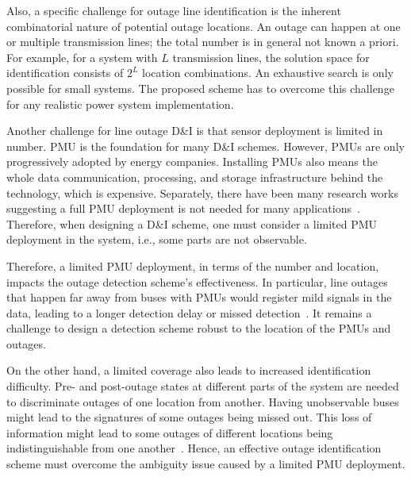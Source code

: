 Also, a specific challenge for outage line identification is the inherent combinatorial nature of potential outage locations. An outage can happen at one or multiple transmission lines; the total number is in general not known a priori. For example, for a system with $L$ transmission lines, the solution space for identification consists of $2^L$ location combinations. An exhaustive search is only possible for small systems. The proposed scheme has to overcome this challenge for any realistic power system implementation.


Another challenge for line outage D\&I is that sensor deployment is limited in number. 
PMU is the foundation for many D\&I schemes. However, PMUs are only progressively adopted by energy companies. Installing PMUs also means the whole data communication, processing, and storage infrastructure behind the technology, which is expensive. Separately, there have been many research works suggesting a full PMU deployment is not needed for many applications~\cite{aminifar2014synchrophasor}. Therefore, when designing a D\&I scheme, one must consider a limited PMU deployment in the system, i.e., some parts are not observable.

Therefore, a limited PMU deployment, in terms of the number and location, impacts the outage detection scheme’s effectiveness. In particular, line outages that happen far away from buses with PMUs would register mild signals in the data, leading to a longer detection delay or missed detection~\cite{yang2020control}. It remains a challenge to design a detection scheme robust to the location of the PMUs and outages. 

On the other hand, a limited coverage also leads to increased identification difficulty. Pre- and post-outage states at different parts of the system are needed to discriminate outages of one location from another. Having unobservable buses might lead to the signatures of some outages being missed out. This loss of information might lead to some outages of different locations being indistinguishable from one another~\cite{Wu2015,Costilla-Enriquez2019,yang2021particle}. Hence, an effective outage identification scheme must overcome the ambiguity issue caused by a limited PMU deployment.



